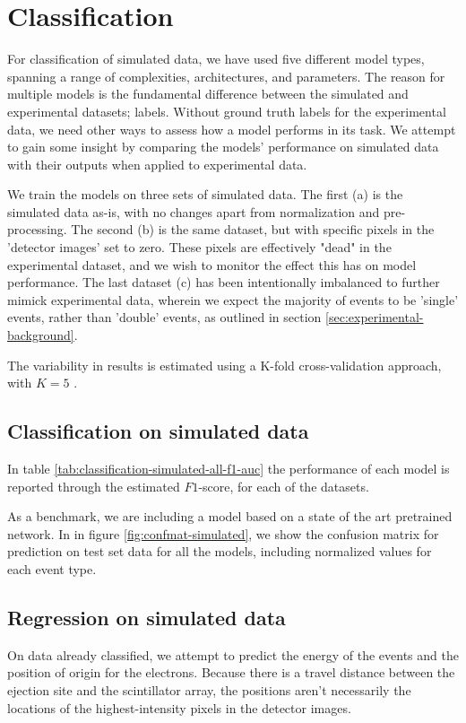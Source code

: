 \section{Classification}
For classification of simulated data, we have used five different model types,
spanning a range of complexities, architectures, and parameters.
The reason for multiple models is the fundamental difference between the
simulated and experimental datasets; labels. Without ground truth labels
for the experimental data, we need other ways to assess how a model performs in
its task. We attempt to gain some insight by comparing the models' performance on
simulated data with their outputs when applied to experimental data.

\noindent We train the models on three sets of simulated data.
The first (a) is the simulated data as-is, with no changes apart from normalization
and pre-processing. The second (b) is the same dataset, but with specific pixels in
the 'detector images' set to zero. These pixels are effectively "dead" in the
experimental dataset, and we wish to monitor the effect this has on model performance.
The last dataset (c) has been intentionally imbalanced to further mimick experimental data,
wherein we expect the majority of events to be 'single' events, rather than 'double'
events, as outlined in section \ref{sec:experimental-background}.

\noindent The variability in results is estimated using a K-fold cross-validation approach, with
$K = 5$ \cite{Stone1974}.

\subsection{Classification on simulated data}

In table \ref{tab:classification-simulated-all-f1-auc} the performance of each model
is reported through the estimated $F1$-score, for each of the datasets.

As a benchmark, we are including a model based on a state of the art pretrained 
network\cite{Simonyan2015}. In in figure \ref{fig:confmat-simulated},
we show the confusion matrix for prediction on test set data for all the models,
including normalized values for each event type.

 
\subsection{Regression on simulated data}
On data already classified, we attempt to predict the energy of the events and the position of origin for
the electrons. Because there is a travel distance between the ejection site and the scintillator array,
the positions aren't necessarily the locations of the highest-intensity pixels in the detector images.
